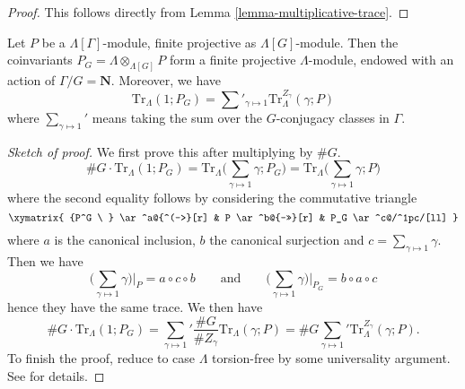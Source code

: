 \begin{proof}
This follows directly from Lemma \ref{lemma-multiplicative-trace}.
\end{proof}

\begin{lemma}
\label{lemma-trivial-trace}
Let $P$ be a $\Lambda[\Gamma]$-module, finite projective as
$\Lambda[G]$-module. Then the coinvariants
$P_G = \Lambda \otimes_{\Lambda[G]} P$
form a finite projective $\Lambda$-module, endowed with an action of
$\Gamma/G = \mathbf{N}$. Moreover, we have
$$
\text{Tr}_\Lambda(1; P_G) =
\sum\nolimits'_{\gamma \mapsto 1} \text{Tr}_\Lambda^{Z_\gamma}(\gamma; P)
$$
where $\sum_{\gamma\mapsto 1}'$ means taking the sum over the $G$-conjugacy
classes in $\Gamma$.
\end{lemma}

\begin{proof}[Sketch of proof]
We first prove this after multiplying by $\#G$.
$$
\# G\cdot \text{Tr}_\Lambda(1; P_G)
= \text{Tr}_\Lambda\bigg(\sum_{\gamma\mapsto 1} \gamma; P_G\bigg)
= \text{Tr}_\Lambda\bigg(\sum_{\gamma\mapsto 1} \gamma; P\bigg)
$$
where the second equality follows by considering the commutative triangle
$$
\xymatrix{
{P^G \ } \ar^a@{^(->}[r] & P \ar^b@{->>}[r] & P_G \ar^c@/^1pc/[ll]
}
$$
where $a$ is the canonical inclusion, $b$ the canonical surjection and $c =
\sum_{\gamma \mapsto 1} \gamma$. Then we have
$$
\bigg(\sum_{\gamma \mapsto 1} \gamma\bigg) \bigg|_P = a \circ c \circ b
\qquad \text{and} \qquad
\bigg(\sum_{\gamma \mapsto 1} \gamma\bigg) \bigg|_{P_G} = b \circ a \circ c
$$
hence they have the same trace. We then have
$$
\# G\cdot \text{Tr}_\Lambda(1; P_G)
=
{\sum_{\gamma\mapsto 1}}' \frac{\# G}{\# Z_\gamma}\text{Tr}_\Lambda(\gamma;P)
= \# G{\sum_{\gamma\mapsto 1}}' \text{Tr}_\Lambda^{Z_\gamma}(\gamma; P).
$$
To finish the proof, reduce to case $\Lambda$ torsion-free by some universality
argument. See \cite{SGA4.5} for details.
\end{proof}

